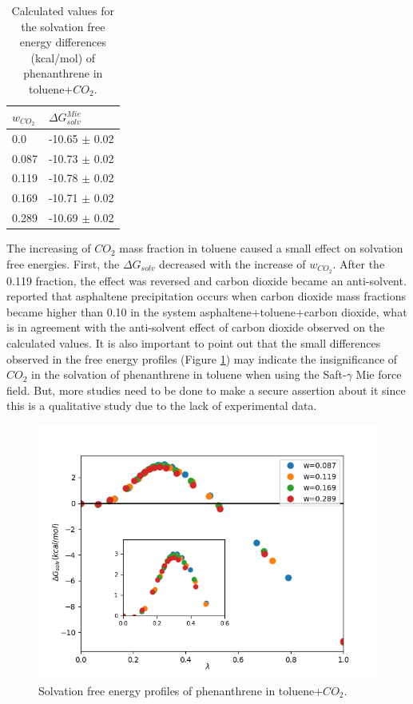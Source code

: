 \FloatBarrier
\begin{table}[H]
\centering
  \caption{Calculated values for the solvation free energy differences (kcal/mol) of phenanthrene in toluene+$CO_{2}$.}
  \label{tbl:solv3}
  \begin{tabular}{ll}
    \hline
      $w_{CO_{2}}$ & $\Delta G_{solv}^{Mie}$ \\
    \hline
    0.0    & -10.65 $\pm$ 0.02   \\
    0.087  & -10.73 $\pm$ 0.02   \\
    0.119  & -10.78 $\pm$ 0.02   \\
    0.169  & -10.71 $\pm$ 0.02   \\
    0.289  & -10.69 $\pm$ 0.02   \\
    \hline
  \end{tabular}
\end{table}
\FloatBarrier

The increasing of $CO_{2}$ mass fraction in toluene caused a small effect on solvation free energies. First, the $\Delta G_{solv}$ decreased with the increase of $w_{CO_{2}}$. After the 0.119 fraction, the effect was reversed and carbon dioxide became an anti-solvent.  reported that asphaltene precipitation occurs when carbon dioxide mass fractions became higher than 0.10 in the system asphaltene+toluene+carbon dioxide, what is in agreement with the anti-solvent effect of carbon dioxide observed on the calculated values. It is also important to point out that the small differences observed in the free energy profiles (Figure \ref{fig:Figure_1}) may indicate the insignificance of $CO_{2}$ in the solvation of phenanthrene in toluene when using the Saft-$\gamma$ Mie force field. But, more studies need to be done to make a secure assertion about it since this is a qualitative study due to the lack of experimental data.   

\begin{figure}[H]
\centering
\includegraphics[width=0.9\linewidth]{Figures/Figure_1}
\caption{Solvation free energy profiles of phenanthrene in toluene+$CO_{2}$.}
\label{fig:Figure_1}
\end{figure}


